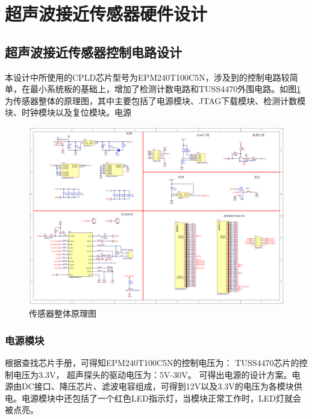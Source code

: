 \newpage
\section{超声波接近传感器硬件设计}

\subsection{超声波接近传感器控制电路设计}
本设计中所使用的CPLD芯片型号为EPM240T100C5N，涉及到的控制电路较简单，在最小系统板的基础上，增加了检测计数电路和TUSS4470外围电路。如图\ref{传感器整体原理图}为传感器整体的原理图，其中主要包括了电源模块、JTAG下载模块、检测计数模块、时钟模块以及复位模块。电源
\begin{figure}[ht]
	\centering
	\includegraphics[width=12cm]{figure/Overall circuit.png}
	\caption{传感器整体原理图}
	\label{传感器整体原理图}
\end{figure}
\subsubsection{电源模块}
根据查找芯片手册，可得知EPM240T100C5N的控制电压为：
TUSS4470芯片的控制电压为3.3V，
超声探头的驱动电压为：5V-30V。
可得出电源的设计方案。电源由DC接口、降压芯片、滤波电容组成，可得到12V以及3.3V的电压为各模块供电。电源模块中还包括了一个红色LED指示灯，当模块正常工作时，LED灯就会被点亮。


